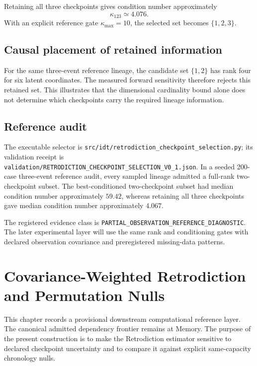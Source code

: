 Retaining all three checkpoints gives condition number approximately
\[
\boxed{\kappa_{123}\simeq4.076.}
\]
With an explicit reference gate \(\kappa_{\max}=10\), the selected set becomes \(\{1,2,3\}\).

\section{Causal placement of retained information}

For the same three-event reference lineage, the candidate set \(\{1,2\}\) has rank four for six latent coordinates. The measured forward sensitivity therefore rejects this retained set. This illustrates that the dimensional cardinality bound alone does not determine which checkpoints carry the required lineage information.

\section{Reference audit}

The executable selector is \texttt{src/idt/retrodiction\_checkpoint\_selection.py}; its validation receipt is \texttt{validation/RETRODICTION\_CHECKPOINT\_SELECTION\_V0\_1.json}. In a seeded 200-case three-event reference audit, every sampled lineage admitted a full-rank two-checkpoint subset. The best-conditioned two-checkpoint subset had median condition number approximately \(59.42\), whereas retaining all three checkpoints gave median condition number approximately \(4.067\).

The registered evidence class is \texttt{PARTIAL\_OBSERVATION\_REFERENCE\_DIAGNOSTIC}. The later experimental layer will use the same rank and conditioning gates with declared observation covariance and preregistered missing-data patterns.


\chapter{Covariance-Weighted Retrodiction and Permutation Nulls}

This chapter records a provisional downstream computational reference layer. The canonical admitted dependency frontier remains at Memory. The purpose of the present construction is to make the Retrodiction estimator sensitive to declared checkpoint uncertainty and to compare it against explicit same-capacity chronology nulls.

